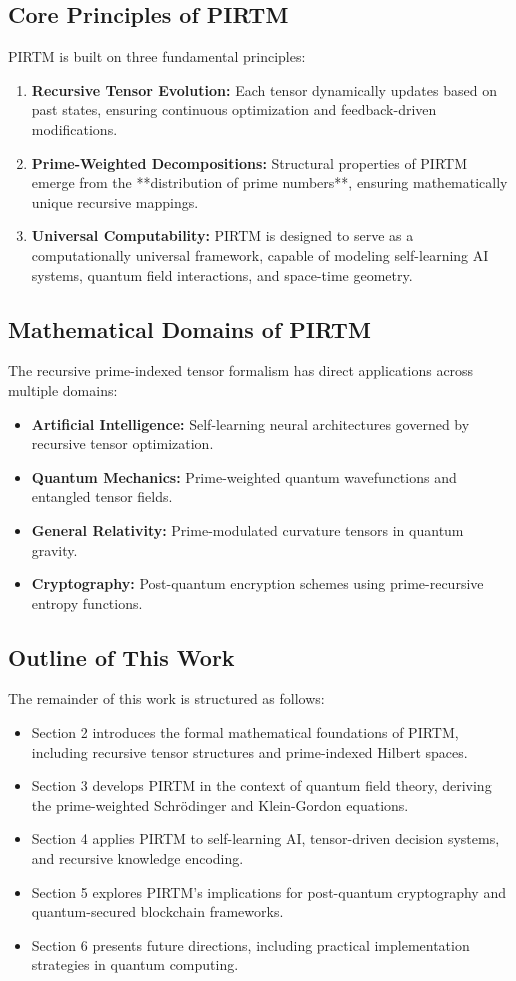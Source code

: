 \documentclass{article}
\theoremstyle{plain}
\begin{document}
\subsection{Core Principles of PIRTM}
PIRTM is built on three fundamental principles:
\begin{enumerate}
    \item \textbf{Recursive Tensor Evolution:} Each tensor dynamically updates based on past states, ensuring continuous optimization and feedback-driven modifications.
    \item \textbf{Prime-Weighted Decompositions:} Structural properties of PIRTM emerge from the **distribution of prime numbers**, ensuring mathematically unique recursive mappings.
    \item \textbf{Universal Computability:} PIRTM is designed to serve as a computationally universal framework, capable of modeling self-learning AI systems, quantum field interactions, and space-time geometry.
\end{enumerate}

\subsection{Mathematical Domains of PIRTM}
The recursive prime-indexed tensor formalism has direct applications across multiple domains:
\begin{itemize}
    \item \textbf{Artificial Intelligence:} Self-learning neural architectures governed by recursive tensor optimization.
    \item \textbf{Quantum Mechanics:} Prime-weighted quantum wavefunctions and entangled tensor fields.
    \item \textbf{General Relativity:} Prime-modulated curvature tensors in quantum gravity.
    \item \textbf{Cryptography:} Post-quantum encryption schemes using prime-recursive entropy functions.
\end{itemize}

\subsection{Outline of This Work}
The remainder of this work is structured as follows:
\begin{itemize}
    \item Section 2 introduces the formal mathematical foundations of PIRTM, including recursive tensor structures and prime-indexed Hilbert spaces.
    \item Section 3 develops PIRTM in the context of quantum field theory, deriving the prime-weighted Schrödinger and Klein-Gordon equations.
    \item Section 4 applies PIRTM to self-learning AI, tensor-driven decision systems, and recursive knowledge encoding.
    \item Section 5 explores PIRTM’s implications for post-quantum cryptography and quantum-secured blockchain frameworks.
    \item Section 6 presents future directions, including practical implementation strategies in quantum computing.
\end{itemize}
\end{document}
